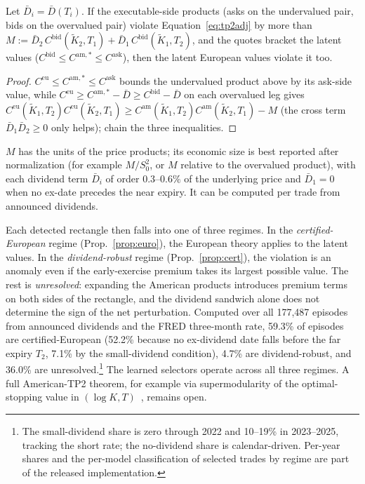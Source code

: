 \documentclass[sigconf,review,anonymous]{acmart}
\begin{document}
\begin{proposition}\label{prop:cert}
Let $\bar D_i=\bar D(T_i)$. If the executable-side products (asks on the undervalued pair, bids on the overvalued pair) violate Equation~\eqref{eq:tp2adj} by more than $M:=\bar D_2\,C^{\mathrm{bid}}(\tilde K_2,T_1)+\bar D_1\,C^{\mathrm{bid}}(\tilde K_1,T_2)$, and the quotes bracket the latent values ($C^{\mathrm{bid}}\le C^{\mathrm{am},*}\le C^{\mathrm{ask}}$), then the latent European values violate it too.
\end{proposition}
\begin{proof}
$C^{\mathrm{eu}}\!\le\!C^{\mathrm{am},*}\!\le\!C^{\mathrm{ask}}$ bounds the undervalued product above by its ask-side value, while $C^{\mathrm{eu}}\!\ge\!C^{\mathrm{am},*}-\bar D\ge C^{\mathrm{bid}}-\bar D$ on each overvalued leg gives $C^{\mathrm{eu}}(\tilde K_1,T_2)C^{\mathrm{eu}}(\tilde K_2,T_1)\ge C^{\mathrm{am}}(\tilde K_1,T_2)C^{\mathrm{am}}(\tilde K_2,T_1)-M$ (the cross term $\bar D_1\bar D_2\ge0$ only helps); chain the three inequalities.
\end{proof}
\noindent $M$ has the units of the price products; its economic size is best reported after normalization (for example $M/S_0^2$, or $M$ relative to the overvalued product), with each dividend term $\bar D_i$ of order $0.3$--$0.6\%$ of the underlying price and $\bar D_1=0$ when no ex-date precedes the near expiry. It can be computed per trade from announced dividends.

Each detected rectangle then falls into one of three regimes. In the \emph{certified-European} regime (Prop.~\ref{prop:euro}), the European theory applies to the latent values. In the \emph{dividend-robust} regime (Prop.~\ref{prop:cert}), the violation is an anomaly even if the early-exercise premium takes its largest possible value. The rest is \emph{unresolved}: expanding the American products introduces premium terms on both sides of the rectangle, and the dividend sandwich alone does not determine the sign of the net perturbation. Computed over all 177{,}487 episodes from announced dividends and the FRED three-month rate, 59.3\% of episodes are certified-European (52.2\% because no ex-dividend date falls before the far expiry $T_2$, 7.1\% by the small-dividend condition), 4.7\% are dividend-robust, and 36.0\% are unresolved.\footnote{The small-dividend share is zero through 2022 and 10--19\% in 2023--2025, tracking the short rate; the no-dividend share is calendar-driven. Per-year shares and the per-model classification of selected trades by regime are part of the released implementation.} The learned selectors operate across all three regimes. A full American-TP2 theorem, for example via supermodularity of the optimal-stopping value in $(\log K,T)$~\cite{topkis1998}, remains open.
\end{document}
